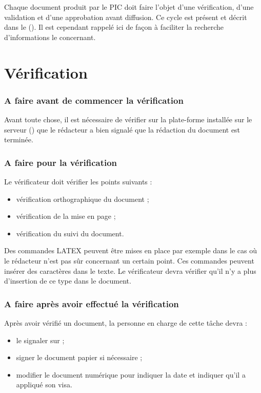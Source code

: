 Chaque document produit par le PIC doit faire l'objet d'une vérification, d'une validation
et d'une approbation avant diffusion. Ce cycle est présent et décrit dans le \PGC{} (\PGCCourt). Il est cependant rappelé ici de façon à faciliter la recherche d'informations le concernant.

\section{Vérification}
\label{Verification}

\subsubsection*{A faire avant de commencer la vérification}
Avant toute chose, il est nécessaire de vérifier sur la plate-forme installée sur le serveur
(\lintranet) que le rédacteur a bien signalé que la rédaction du document est terminée.

\subsubsection*{A faire pour la vérification}
Le vérificateur doit vérifier les points suivants :
\begin{itemize}
\item vérification orthographique du document ;
\item vérification de la mise en page ;
\item vérification du suivi du document.
\end{itemize}
Des commandes LATEX peuvent être mises en place par exemple dans le cas où le rédacteur
n'est pas sûr concernant un certain point. Ces commandes peuvent insérer des caractères dans le texte.
Le vérificateur devra vérifier qu'il n'y a plus d'insertion de ce type dans le document.

\subsubsection*{A faire après avoir effectué la vérification}

Après avoir vérifié un document, la personne en charge de cette tâche devra :
\begin{itemize}
\item le signaler sur \lintranet ;
\item signer le document papier si nécessaire ;
\item modifier le document numérique pour indiquer la date et indiquer qu'il a appliqué son
visa.
\end{itemize}

